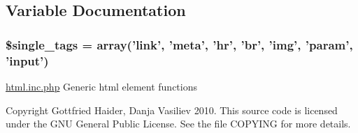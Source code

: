 \subsection{Variable Documentation}
\hypertarget{html_8inc_8php_0a733c7a281726a879f13e7325881887}{
\subsubsection[{\$single\_\-tags}]{\setlength{\rightskip}{0pt plus 5cm}\$single\_\-tags = array('link', 'meta', 'hr', 'br', 'img', 'param', 'input')}}
\label{html_8inc_8php_0a733c7a281726a879f13e7325881887}


\hyperlink{html_8inc_8php}{html.inc.php} Generic html element functions

Copyright Gottfried Haider, Danja Vasiliev 2010. This source code is licensed under the GNU General Public License. See the file COPYING for more details. 